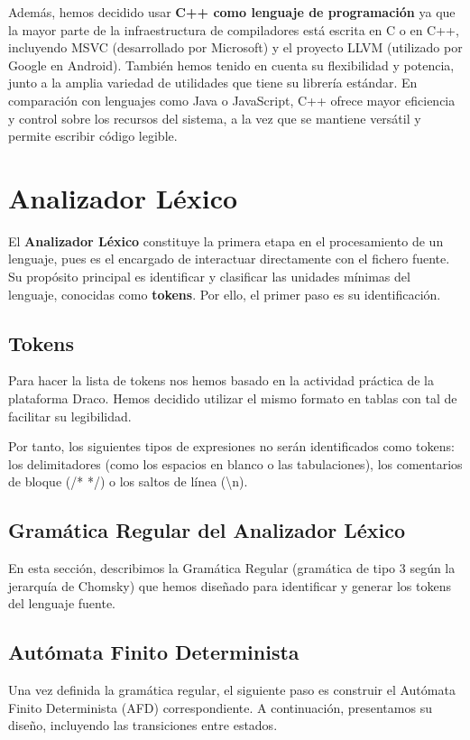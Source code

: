 \documentclass{article}
\begin{document}
Además, hemos decidido usar \textbf{C++ como lenguaje de programación} ya que la mayor parte de la infraestructura de compiladores está escrita en C o en C++, incluyendo MSVC (desarrollado por Microsoft) y el proyecto LLVM (utilizado por Google en Android). También hemos tenido en cuenta su flexibilidad y potencia, junto a la amplia variedad de utilidades que tiene su librería estándar. En comparación con lenguajes como Java o JavaScript, C++ ofrece mayor eficiencia y control sobre los recursos del sistema, a la vez que se mantiene versátil y permite escribir código legible.

\newpage

\section{Analizador Léxico}
El \textbf{Analizador Léxico} constituye la primera etapa en el procesamiento de un lenguaje, pues es el encargado de interactuar directamente con el fichero fuente. Su propósito principal es identificar y clasificar las unidades mínimas del lenguaje, conocidas como \textbf{tokens}. Por ello, el primer paso es su identificación.

\subsection{Tokens}
Para hacer la lista de tokens nos hemos basado en la actividad práctica de la plataforma Draco. Hemos decidido utilizar el mismo formato en tablas con tal de facilitar su legibilidad.\\

{\small
}

Por tanto, los siguientes tipos de expresiones no serán identificados como tokens: los delimitadores (como los espacios en blanco o las tabulaciones), los comentarios de bloque (/* */) o los saltos de línea (\textbackslash n).

\subsection{Gramática Regular del Analizador Léxico}

En esta sección, describimos la Gramática Regular (gramática de tipo 3 según la jerarquía de Chomsky) que hemos diseñado para identificar y generar los tokens del lenguaje fuente. 



\subsection{Autómata Finito Determinista}
Una vez definida la gramática regular, el siguiente paso es construir el Autómata Finito Determinista (AFD) correspondiente. A continuación, presentamos su diseño, incluyendo las transiciones entre estados.
\end{document}

